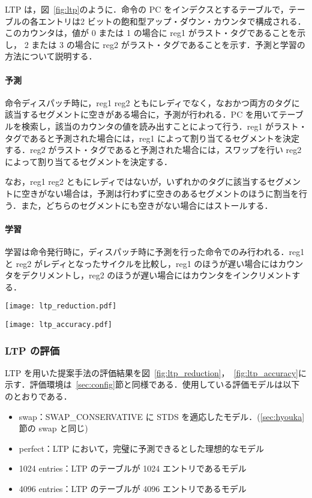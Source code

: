 \documentclass[twocolumn]{jsarticle}
\begin{document}
  LTP は，図~\ref{fig:ltp}のように．命令の PC をインデクスとするテーブルで，テーブルの各エントリは2 ビットの飽和型アップ・ダウン・カウンタで構成される．このカウンタは，値が 0 または 1 の場合に reg1 がラスト・タグであることを示し， 2 または 3 の場合に reg2 がラスト・タグであることを示す．予測と学習の方法について説明する．
  
  \paragraph{予測}命令ディスパッチ時に，reg1 reg2 ともにレディでなく，なおかつ両方のタグに該当するセグメントに空きがある場合に，予測が行われる．PC を用いてテーブルを検索し，該当のカウンタの値を読み出すことによって行う．reg1 がラスト・タグであると予測された場合には，reg1 によって割り当てるセグメントを決定する．reg2 がラスト・タグであると予測された場合には，スワップを行い reg2 によって割り当てるセグメントを決定する．
  
  なお，reg1 reg2 ともにレディではないが，いずれかのタグに該当するセグメントに空きがない場合は，予測は行わずに空きのあるセグメントのほうに割当を行う．また，どちらのセグメントにも空きがない場合にはストールする．

  \paragraph{学習}
  学習は命令発行時に，ディスパッチ時に予測を行った命令でのみ行われる．reg1 と reg2 がレディとなったサイクルを比較し，reg1 のほうが遅い場合にはカウンタをデクリメントし，reg2 のほうが遅い場合にはカウンタをインクリメントする．

  \begin{figure*}[ht]
    \centering
    \texttt{[image: ltp\_reduction.pdf]}
    \caption{LTP を適応した提案手法による比較回数削減(hugeモデル)}
    \label{fig:ltp_reduction}
  \end{figure*}

  \begin{figure*}[ht]
    \centering
    \texttt{[image: ltp\_accuracy.pdf]}
    \caption{LTP の予測精度(hugeモデル)}
    \label{fig:ltp_accuracy}
  \end{figure*}

  \subsubsection{LTP の評価}
  LTP を用いた提案手法の評価結果を図~\ref{fig:ltp_reduction}，~\ref{fig:ltp_accuracy}に示す．評価環境は~\ref{sec:config}節と同様である．使用している評価モデルは以下のとおりである．
  \begin{itemize}
    \item swap：SWAP\_CONSERVATIVE に STDS を適応したモデル．(\ref{sec:hyouka}節の swap と同じ)
    \item perfect：LTP において，完璧に予測できるとした理想的なモデル
    \item 1024 entries：LTP のテーブルが 1024 エントリであるモデル
    \item 4096 entries：LTP のテーブルが 4096 エントリであるモデル
  \end{itemize}
\end{document}
